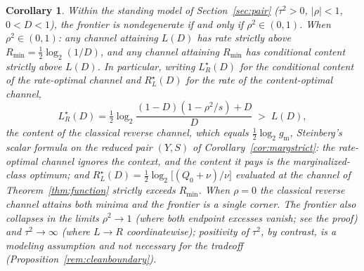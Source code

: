 \documentclass[11pt,onecolumn]{IEEEtran}
\newtheorem{corollary}[theorem]{Corollary}
\newcommand{\LRs}{L_{R}^{\star}}
\newcommand{\RLs}{R_{L}^{\star}}
\begin{document}
\begin{corollary}
\label{cor:misalign}
Within the standing model of Section~\ref{sec:pair} ($\tau^2>0$,
$|\rho|<1$, $0<D<1$), the frontier is nondegenerate if and only if
$\rho^2\in(0,1)$. When $\rho^2\in(0,1)$: any channel attaining $L(D)$
has rate strictly above $R_{\min}=\tfrac12\log_2(1/D)$, and any
channel attaining $R_{\min}$ has conditional content strictly above
$L(D)$. In particular, writing $\LRs(D)$ for the conditional content of
the rate-optimal channel and $\RLs(D)$ for the rate of the
content-optimal channel,
\[
\LRs(D)=\tfrac12\log_2\frac{(1-D)(1-\rho^2/s)+D}{D}\;>\;L(D),
\]
the content of the classical reverse channel, which equals
$\tfrac12\log_2 g_{\mathrm m}$, Steinberg's scalar formula on the reduced
pair $(Y,S)$ of Corollary~\ref{cor:margstrict}: the rate-optimal channel
ignores the context, and the content it pays is the marginalized-class
optimum; and
$\RLs(D)=\tfrac12\log_2\bigl[(Q_0+\nu)/\nu\bigr]$ evaluated at the channel of
Theorem~\ref{thm:function} strictly exceeds $R_{\min}$. When $\rho=0$ the classical reverse channel
attains both minima and the frontier is a single corner. The frontier
also collapses in the limits $\rho^2\to1$ (where both endpoint
excesses vanish; see the proof) and $\tau^2\to\infty$ (where
$L\to R$ coordinatewise); positivity of $\tau^2$, by contrast, is a
modeling assumption and not necessary for the tradeoff
(Proposition~\ref{rem:cleanboundary}).
\end{corollary}
\end{document}
